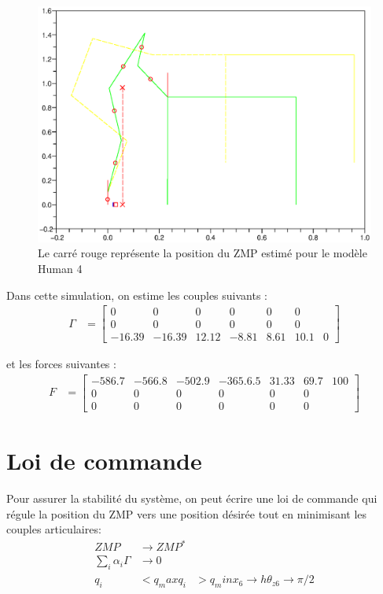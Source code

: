 \documentclass[a4paper, 10pt ]{article}
\begin{document}
 \begin{figure}[h]
\centering
\includegraphics[width=0.8\columnwidth]{images/simu/Fext100/ZMPHu4.eps}
\caption{Le carré rouge représente la position du ZMP estimé pour le modèle Human 4}
\label{fig:ZMPHu4100}
\end{figure}

Dans cette simulation, on estime les couples suivants : 
\begin{align}
\Gamma & = 
	\begin{bmatrix}
		0&0&0&0&0&0\\
		0&0&0&0&0&0\\
		-16.39&-16.39&12.12&-8.81&8.61&10.1&0
	\end{bmatrix}
\end{align}

\noindent et les forces suivantes :
\begin{align}
F & = 
	\begin{bmatrix}
	    -586.7&-566.8&-502.9&-365.6.5&31.33&69.7&100\\
		0&0&0&0&0&0\\
		0&0&0&0&0&0
	\end{bmatrix}
\end{align}

\section{Loi de commande}

Pour assurer la stabilité du système, on peut écrire une loi de commande qui régule  la position du ZMP vers une position désirée tout en minimisant les couples articulaires: 
\begin{align}
ZMP&\rightarrow ZMP^*\\
\sum_i \alpha_i \Gamma &\rightarrow 0\\
q_i&<q_max
q_i&>q_min
x_6 \rightarrow h
\theta_{z6} \rightarrow \pi/2
\end{align}
\end{document}
